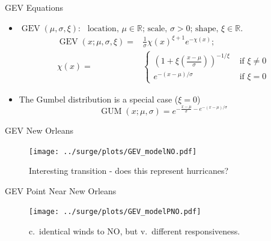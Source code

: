     \begin{frame}{GEV Equations }
    \begin{itemize}
\item
\(
\operatorname{GEV}(\mu, \sigma, \xi):
\)
\(
\text{ location, } \mu \in \mathbb{R}
\text{; scale, } \sigma>0
\text{; shape, } \xi \in \mathbb{R}.
\)
\begin{eqnarray}
\operatorname{GEV}(x; \mu, \sigma, \xi)=&
\frac{1}{\sigma} \chi(x)^{\xi+1} e^{-\chi(x)};\\
\chi(x)=&\left\{\begin{array}{ll}
\left(1+\xi\left(\frac{x-\mu}{\sigma}\right)\right)^{-1 / \xi} & \text { if } \xi \neq 0 \\
e^{-(x-\mu) / \sigma} & \text { if } \xi=0
\end{array}\right.
\end{eqnarray}
\item The Gumbel distribution is a special case ($\xi=0$)
\begin{equation}
\operatorname{GUM}(x ; \mu, \sigma)=e^{-\frac{x-\mu}{\sigma}-e^{-(x-\mu) / \sigma}}
\end{equation}
\end{itemize}
\end{frame}


\begin{frame}{GEV New Orleans}
\vspace{-20pt}
 \begin{minipage}{1.0\textwidth}
\begin{figure}[htb!]
    \centering
    \texttt{[image: ../surge/plots/GEV\_modelNO.pdf]}
    \vspace{-25pt}
   \caption{Interesting transition - does this represent hurricanes?}
    \label{fig:}
\end{figure}
\end{minipage}
\end{frame}


\begin{frame}{GEV Point Near New Orleans}
\vspace{-20pt}
 \begin{minipage}{1.0\textwidth}
\begin{figure}[htb!]
    \centering
    \texttt{[image: ../surge/plots/GEV\_modelPNO.pdf]}
    \vspace{-25pt}
   \caption{c.\ identical winds to NO, but v.\ different
     responsiveness. }
\end{figure}
\end{minipage}
\end{frame}

